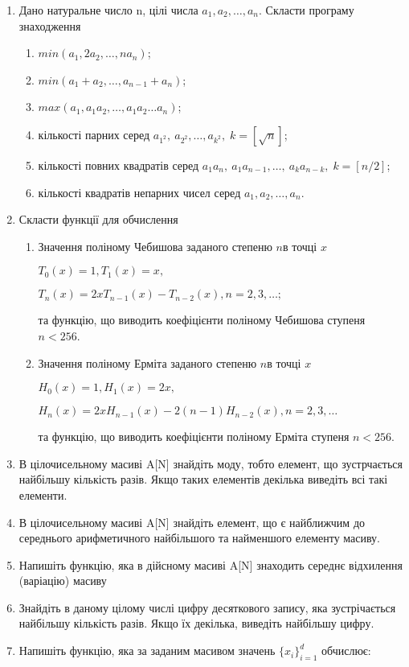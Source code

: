 \documentclass[]{article}
\makeatletter
\newcommand{\xslalph}[1]{\expandafter\@xslalph\csname c@#1\endcsname}
\newcommand{\@xslalph}[1]{%
    \ifcase#1\or а\or б\or в\or г\or д\or e\or є\or ж\or з\or i%
    \or й\or к\or л\or м\or н\or о\or п\or р\or с\or т%
    \or у\or ф\or х\or ц\or ч\or ш\or ю\or я\or аа\or бб\or вв%
    \else\@ctrerr\fi%
}
\makeatother
\begin{document}
\begin{enumerate}
\begin{enumerate}[label=\xslalph*)]
\end{enumerate}

\item Дано натуральне число n, цілі числа \(a_{1},a_{2},\ldots,a_{n}\).
Скласти програму знаходження
\begin{enumerate}[label=\xslalph*)]
\item
 \(min(a_{1},2a_{2},\ldots,na_{n})\);

\item \(min(a_{1} + a_{2},\ldots,a_{n - 1} + a_{n})\);

\item \(max(a_{1},a_{1}a_{2},\ldots,a_{1}a_{2}\ldots a_{n})\);
\item кількості парних серед \(a_{1^2},\ a_{2^2},\ldots,a_{k^2},\; k=[\sqrt{n}] \);
\item кількості повних квадратів серед \(a_{1}a_{n},\ a_{1}a_{n-1},\ldots,\ a_{k}a_{n-k},\; k=[n/2]\);
\item кількості квадратів непарних чисел серед
\(a_{1},a_{2},\ldots,a_{n}\).
\end{enumerate}

\item
Скласти функції для обчислення
\begin{enumerate}[label=\xslalph*)]
\item
Значення поліному Чебишова заданого степеню \(n\)в точці \(x\)

\(T_{0}(x) = 1,T_{1}(x) = x,\)

\(T_{n}(x) = 2xT_{n - 1}(x) - T_{n - 2}(x),n = 2,3,\ldots;\)

та функцію, що виводить коефіцієнти поліному Чебишова ступеня $n<256$.

\item
Значення поліному Ерміта заданого степеню \(n\)в точці \(x\)

\(H_{0}(x) = 1,H_{1}(x) = 2x,\)

\(H_{n}(x) = 2xH_{n - 1}(x) - 2(n - 1)H_{n - 2}(x),n = 2,3,\ldots\)

та функцію, що виводить коефіцієнти поліному Ерміта ступеня $n<256$.
\end{enumerate}
\item
  В цілочисельному масиві A{[}N{]} знайдіть моду, тобто елемент, що
  зустрчається найбільшу кількість разів. Якщо таких елементів декілька
  виведіть всі такі елементи.

\item
  В цілочисельному масиві A{[}N{]} знайдіть елемент, що є найближчим до
  середнього арифметичного найбільшого та найменшого елементу масиву.
\item
  Напишіть функцію, яка в дійсному масиві A{[}N{]} знаходить середнє
  відхилення (варіацію) масиву
\item
  Знайдіть в даному цілому числі цифру десяткового запису, яка
  зустрічається найбільшу кількість разів. Якщо їх декілька, виведіть
  найбільшу цифру.
\item
  Напишіть функцію, яка за заданим масивом значень
  \({\{ x_{i}\}}_{i = 1}^{d}\) обчислює:


\end{enumerate}
\end{document}
